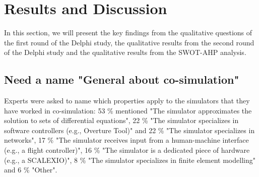 \section{Results and Discussion}

In this section, we will present the key findings from the qualitative questions of the first round of the Delphi study, the qualitative results from the second round of the Delphi study and the qualitative results from the SWOT-AHP analysis.



\subsection{Need a name "General about co-simulation"}
Experts were asked to name which properties apply to the simulators that they have worked in co-simulation: 53 \% mentioned "The simulator approximates the solution to sets of differential equations", 22 \% "The simulator specializes in software controllers (e.g., Overture Tool)" and 22 \% "The simulator specializes in networks", 17 \% "The simulator receives input from a human-machine interface (e.g., a flight controller)", 16 \% "The simulator is a dedicated piece of hardware (e.g., a SCALEXIO)", 8 \% "The simulator specializes in finite element modelling" and  6 \% "Other".

